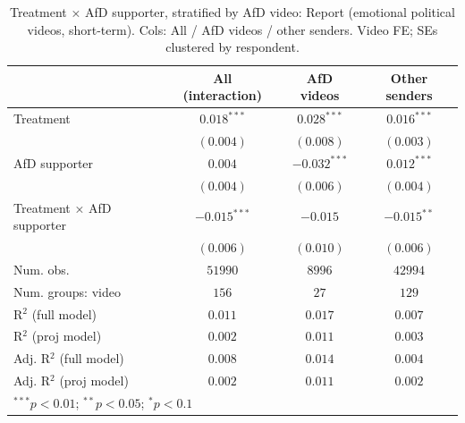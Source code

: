 
\begin{table}
\begin{center}
\begin{tabular}{l c c c}
\hline
 & All (interaction) & AfD videos & Other senders \\
\hline
Treatment                 & $0.018^{***}$  & $0.028^{***}$  & $0.016^{***}$ \\
                          & $(0.004)$      & $(0.008)$      & $(0.003)$     \\
AfD supporter             & $0.004$        & $-0.032^{***}$ & $0.012^{***}$ \\
                          & $(0.004)$      & $(0.006)$      & $(0.004)$     \\
Treatment × AfD supporter & $-0.015^{***}$ & $-0.015$       & $-0.015^{**}$ \\
                          & $(0.006)$      & $(0.010)$      & $(0.006)$     \\
\hline
Num. obs.                 & $51990$        & $8996$         & $42994$       \\
Num. groups: video        & $156$          & $27$           & $129$         \\
R$^2$ (full model)        & $0.011$        & $0.017$        & $0.007$       \\
R$^2$ (proj model)        & $0.002$        & $0.011$        & $0.003$       \\
Adj. R$^2$ (full model)   & $0.008$        & $0.014$        & $0.004$       \\
Adj. R$^2$ (proj model)   & $0.002$        & $0.011$        & $0.002$       \\
\hline
\multicolumn{4}{l}{\scriptsize{$^{***}p<0.01$; $^{**}p<0.05$; $^{*}p<0.1$}}
\end{tabular}
\caption{Treatment × AfD supporter, stratified by AfD video: Report (emotional political videos, short-term). Cols: All / AfD videos / other senders. Video FE; SEs clustered by respondent.}
\label{tab:afd_video_hetero_report}
\end{center}
\end{table}

